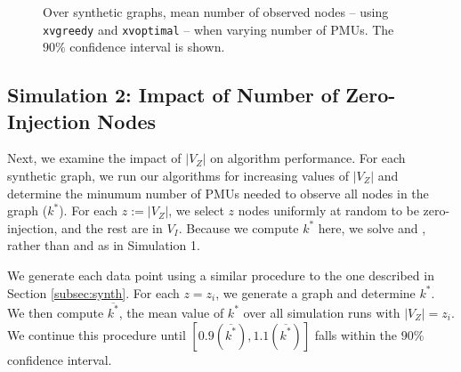{\begin{figure}[t]
\begin{center}
  \end{center}
	\caption{Over synthetic graphs, mean number of observed nodes -- using {\tt xvgreedy} and {\tt xvoptimal} -- when varying number of PMUs. The $90\%$ confidence interval is shown.}
  \label{fig:xv-res}
\end{figure}





\subsection{Simulation 2: Impact of Number of Zero-Injection Nodes}
\label{subsec:zero}

Next, we examine the impact of $|V_Z|$ on algorithm performance. 
For each synthetic graph, we run our algorithms for increasing values of $|V_Z|$ and determine the minumum number of PMUs needed to observe all nodes in the graph ($k^*$).
For each $z:=|V_Z|$, we select $z$ nodes uniformly at random to be zero-injection, and the rest are in $V_I$. Because we compute $k^*$ here, we solve \full and \xvals, rather than
\maxinc and \xvalparts as in Simulation 1.

We generate each data point using a similar procedure to the one described in Section \ref{subsec:synth}.  
For each $z=z_i$, we generate a graph and determine $k^*$. %
We then compute $\overline{k^*}$, the mean value of $k^*$ over all simulation runs with $|V_Z| = z_i$.
We continue this procedure until $[0.9(\overline{k^*}),1.1(\overline{k^*})]$ falls within the $90\%$ confidence interval.

}
